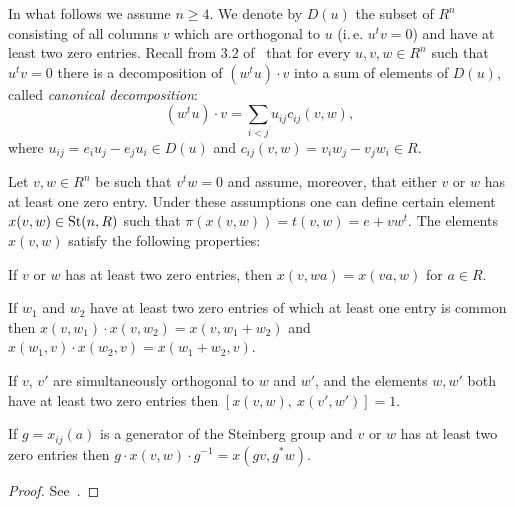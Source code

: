 In what follows we assume $n \geq 4$.
We denote by $D(u)$ the subset of $R^n$ consisting of all columns $v$ which are orthogonal to $u$
(i.\,e. $u^{t} v = 0$) and have at least two zero entries.
Recall from 3.2 of~\cite{Ka77} that for every $u, v, w \in R^n$ such that $u^t v = 0$ there
is a decomposition of $(w^t u) \cdot v$ into a sum of elements of $D(u)$, called \textit{canonical decomposition}:
\begin{equation}
    \label{eq:canonical} (w^tu) \cdot v=\sum_{i<j}u_{ij} c_{ij}(v, w),
\end{equation}
where $u_{ij} =e_i u_j-e_j u_i \in D(u)$ and $c_{ij}(v, w) =v_i w_j-v_j w_i \in R$.

\begin{lemma}
    \label{lem:xsmall-properties}
    Let $v, w \in R^n$ be such that $v^t w = 0$ and assume, moreover, that either $v$ or $w$ has at least one zero entry.
    Under these assumptions one can define certain element $x(v, w) \in \operatorname{St}(n, R)$ such that $\pi(x(v, w)) = t(v, w) = e + vw^t$.
    The elements $x(v, w)$ satisfy the following properties:
    \begin{lemlist}
        \item \label{itm:xsmall-scalar} If $v$ or $w$ has at least two zero entries, then $x(v, wa) = x(va, w)$ for $a\in R$.
        \item \label{itm:xsmall-additivity} If $w_1$ and $w_2$ have at least two zero entries of which at least one entry is common
        then $x(v, w_1) \cdot x(v, w_2) = x(v, w_1+w_2)$ and $x(w_1, v) \cdot x(w_2, v) = x(w_1 + w_2, v)$.
        \item \label{itm:xsmall-commute} If $v$, $v'$ are simultaneously orthogonal to $w$ and $w'$, and the elements $w, w'$ both have at least two zero entries then
        $[x(v, w),\ x(v', w')] = 1$.
        \item \label{itm:xsmall-conj} If $g = x_{ij}(a)$ is a generator of the Steinberg group and $v$ or $w$ has at least two zero entries then
        $g \cdot x(v, w) \cdot g^{-1} = x(gv, g^*w)$.
    \end{lemlist}
\end{lemma}
\begin{proof}
    See~\cite[Lemma~1.1]{Tu83}.
\end{proof}

